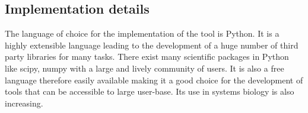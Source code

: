 \documentclass[12pt,a4paper,titlepage]{article}
\begin{document}

\subsection{Implementation details}
The language of choice for the implementation of the tool is Python. It is a highly extensible language leading to the development of a huge number of third party libraries for many tasks. There exist many scientific packages in Python like scipy\cite{scipy}, numpy with a large and lively community of users. It is also a free language therefore easily available making it a good choice for the development of tools that can be accessible to large user-base. Its use in systems biology is also increasing\cite{myers2007python, olivier2002modelling}.




\end{document}
